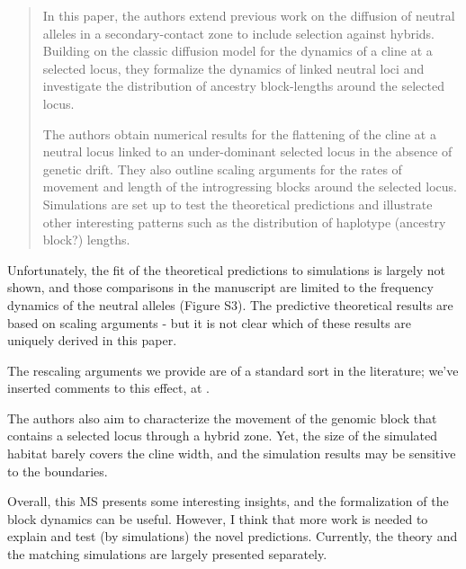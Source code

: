 \begin{quote}
    In this paper, the authors extend previous work on the diffusion of neutral alleles in a secondary-contact zone to include selection against hybrids. Building on the classic diffusion model for the dynamics of a cline at a selected locus, they formalize the dynamics of linked neutral loci and investigate the distribution of ancestry block-lengths around the selected locus.

    The authors obtain numerical results for the flattening of the cline at a neutral locus linked to an under-dominant selected locus in the absence of genetic drift. They also outline scaling arguments for the rates of movement and length of the introgressing blocks around the selected locus. Simulations are set up to test the theoretical predictions and illustrate other interesting patterns such as the distribution of haplotype (ancestry block?) lengths.
\end{quote}

\begin{point}{}
    Unfortunately, the fit of the theoretical predictions to simulations is largely not shown, and those comparisons in the manuscript are limited to the frequency dynamics of the neutral alleles (Figure S3). The predictive theoretical results are based on scaling arguments - but it is not clear which of these results are uniquely derived in this paper.
\end{point}

\reply
{}

The rescaling arguments we provide  are of a standard sort in the literature;
we've inserted comments to this effect, at  .


\begin{point}{}
    The authors also aim to characterize the movement of the genomic block that contains a selected locus through a hybrid zone. Yet, the size of the simulated habitat barely covers the cline width, and the simulation results may be sensitive to the boundaries.

Overall, this MS presents some interesting insights, and the formalization of the block dynamics can be useful. However, I think that more work is needed to explain and test (by simulations) the novel predictions. Currently, the theory and the matching simulations are largely presented separately.
\end{point}

